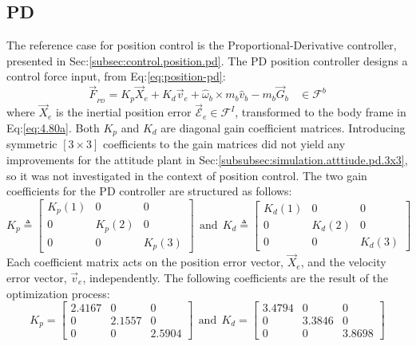 \subsection{PD}
\label{subsec:simulation.position.pd}
The reference case for position control is the Proportional-Derivative controller, presented in Sec:\ref{subsec:control.position.pd}. The PD position controller designs a control force input, from Eq:\ref{eq:position-pd}:
\begin{equation}\label{eq:optimized-position}
\vec{F}_{_{PD}}=K_p\vec{X}_e + K_d\vec{v}_e + \hat{\omega}_b\times m_b\hat{v}_b-m_b\vec{G}_b~~~~\in\mathcal{F}^{b}
\end{equation}
where $\vec{X}_e$ is the inertial position error $\vec{\mathcal{E}}_e\in\mathcal{F}^{I}$, transformed to the body frame in Eq:\ref{eq:4.80a}. Both $K_p$ and $K_d$ are diagonal gain coefficient matrices. Introducing symmetric $[3\times 3]$ coefficients to the gain matrices did not yield any improvements for the attitude plant in Sec:\ref{subsubsec:simulation.atttiude.pd.3x3}, so it was not investigated in the context of position control. The two gain coefficients for the PD controller are structured as follows:
\begin{equation}\label{eq:simulation-attitde-pd-diagonal-coefficients}
K_p\triangleq \begin{bmatrix}
K_p(1) & 0 & 0\\
0 & K_p(2) & 0\\
0 & 0 & K_p(3)
\end{bmatrix}
~~\text{and}~~K_d\triangleq \begin{bmatrix}
K_d(1) & 0 & 0\\
0 & K_d(2) & 0\\
0 & 0 & K_d(3)
\end{bmatrix}
\end{equation}
Each coefficient matrix acts on the position error vector, $\vec{X}_e$, and the velocity error vector, $\vec{v}_e$, independently. The following coefficients are the result of the optimization process:
\begin{equation}\label{eq:optimized-position-pd}
K_p = \begin{bmatrix}
2.4167 & 0 & 0\\
0 & 2.1557 & 0\\
0 & 0 & 2.5904
\end{bmatrix}
~~\text{and}~~K_d = \begin{bmatrix}
3.4794 & 0 & 0\\
0 & 3.3846 & 0\\
0 & 0 & 3.8698
\end{bmatrix}
\end{equation}
